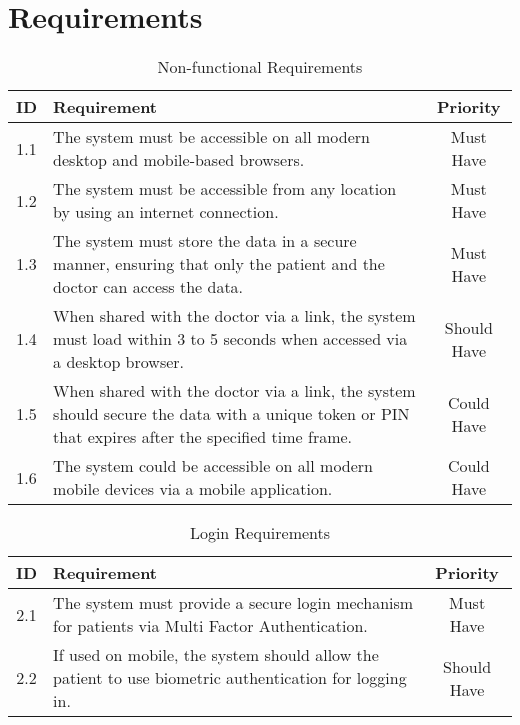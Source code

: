 \appendix

\chapter{Requirements}\label{sec:requirements}

\begin{table}[h!]
    \centering
    \begin{tabular}{|c|p{10cm}|c|}
    \hline
    \textbf{ID}  & \textbf{Requirement}  & \textbf{Priority} \\ \hline
    1.1  & The system must be accessible on all modern desktop and mobile-based browsers.       & Must Have \\ \hline
    1.2  & The system must be accessible from any location by using an internet connection.     & Must Have \\ \hline
    1.3  & The system must store the data in a secure manner, ensuring that only the patient and the doctor can access the data. & Must Have \\ \hline
    1.4  & When shared with the doctor via a link, the system must load within 3 to 5 seconds when accessed via a desktop browser. & Should Have \\ \hline
    1.5  & When shared with the doctor via a link, the system should secure the data with a unique token or PIN that expires after the specified time frame. & Could Have \\ \hline
    1.6  & The system could be accessible on all modern mobile devices via a mobile application. & Could Have \\ \hline
    \end{tabular}
    \caption{Non-functional Requirements}
\end{table}
    
\begin{table}[h!]
    \centering
    \begin{tabular}{|c|p{10cm}|c|}
    \hline
    \textbf{ID}  & \textbf{Requirement}  & \textbf{Priority} \\ \hline
    2.1  & The system must provide a secure login mechanism for patients via Multi Factor Authentication. & Must Have \\ \hline
    2.2  & If used on mobile, the system should allow the patient to use biometric authentication for logging in. & Should Have \\ \hline
    \end{tabular}
    \caption{Login Requirements}
\end{table}


